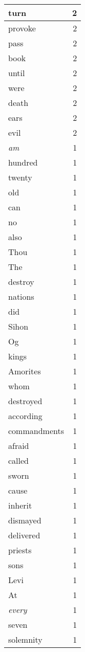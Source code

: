 \begin{center}
\begin{longtable}{l|r}
turn & 2 \\ \hline
provoke & 2 \\ \hline
pass & 2 \\ \hline
book & 2 \\ \hline
until & 2 \\ \hline
were & 2 \\ \hline
death & 2 \\ \hline
ears & 2 \\ \hline
evil & 2 \\ \hline
\emph{am} & 1 \\ \hline
hundred & 1 \\ \hline
twenty & 1 \\ \hline
old & 1 \\ \hline
can & 1 \\ \hline
no & 1 \\ \hline
also & 1 \\ \hline
Thou & 1 \\ \hline
The & 1 \\ \hline
destroy & 1 \\ \hline
nations & 1 \\ \hline
did & 1 \\ \hline
Sihon & 1 \\ \hline
Og & 1 \\ \hline
kings & 1 \\ \hline
Amorites & 1 \\ \hline
whom & 1 \\ \hline
destroyed & 1 \\ \hline
according & 1 \\ \hline
commandments & 1 \\ \hline
afraid & 1 \\ \hline
called & 1 \\ \hline
sworn & 1 \\ \hline
cause & 1 \\ \hline
inherit & 1 \\ \hline
dismayed & 1 \\ \hline
delivered & 1 \\ \hline
priests & 1 \\ \hline
sons & 1 \\ \hline
Levi & 1 \\ \hline
At & 1 \\ \hline
\emph{every} & 1 \\ \hline
seven & 1 \\ \hline
solemnity & 1 \\ \hline

\end{longtable}
\end{center}
